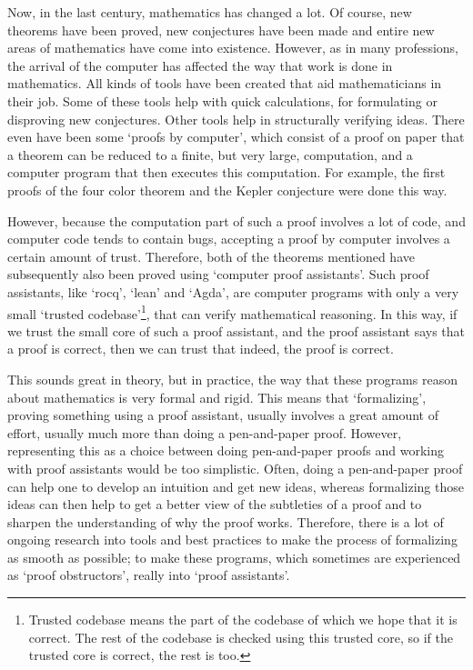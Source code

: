 Now, in the last century, mathematics has changed a lot. Of course, new theorems have been proved, new conjectures have been made and entire new areas of mathematics have come into existence. However, as in many professions, the arrival of the computer has affected the way that work is done in mathematics. All kinds of tools have been created that aid mathematicians in their job. Some of these tools help with quick calculations, for formulating or disproving new conjectures. Other tools help in structurally verifying ideas. There even have been some `proofs by computer', which consist of a proof on paper that a theorem can be reduced to a finite, but very large, computation, and a computer program that then executes this computation. For example, the first proofs of the four color theorem \autocite{four-color-theorem} and the Kepler conjecture \autocite{Kepler-conjecture} were done this way.

However, because the computation part of such a proof involves a lot of code, and computer code tends to contain bugs, accepting a proof by computer involves a certain amount of trust. Therefore, both of the theorems mentioned have subsequently also been proved using `computer proof assistants'\autocite{formalized-four-color-theorem}\autocite{formalized-Kepler-conjecture}. Such proof assistants, like `rocq', `lean' and `Agda', are computer programs with only a very small `trusted codebase'\footnote{Trusted codebase means the part of the codebase of which we hope that it is correct. The rest of the codebase is checked using this trusted core, so if the trusted core is correct, the rest is too.}, that can verify mathematical reasoning. In this way, if we trust the small core of such a proof assistant, and the proof assistant says that a proof is correct, then we can trust that indeed, the proof is correct.

This sounds great in theory, but in practice, the way that these programs reason about mathematics is very formal and rigid. This means that `formalizing', proving something using a proof assistant, usually involves a great amount of effort, usually much more than doing a pen-and-paper proof. However, representing this as a choice between doing pen-and-paper proofs and working with proof assistants would be too simplistic. Often, doing a pen-and-paper proof can help one to develop an intuition and get new ideas, whereas formalizing those ideas can then help to get a better view of the subtleties of a proof and to sharpen the understanding of why the proof works. Therefore, there is a lot of ongoing research into tools and best practices to make the process of formalizing as smooth as possible; to make these programs, which sometimes are experienced as `proof obstructors', really into `proof assistants'.


